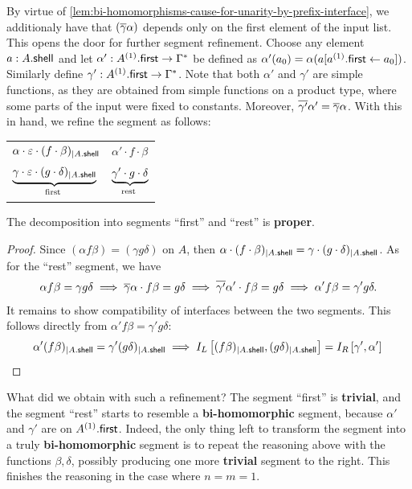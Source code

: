 By virtue of \cref{lem:bi-homomorphisms-cause-for-unarity-by-prefix-interface}, we additionaly have that $(\overline{\gamma} \alpha)$ depends only on the first element of the input list. This opens the door for further segment refinement. Choose any element $a : A . \mathsf{shell}$ and let $\alpha' : A^{(1)} . \mathsf{first} \to \Gamma^*$ be defined as $\alpha'(a_0) = \alpha(a[a^{(1)} . \mathsf{first} \leftarrow a_0])$. Similarly define $\gamma' : A^{(1)} . \mathsf{first} \to \Gamma^*$. Note that both $\alpha'$ and $\gamma'$ are simple functions, as they are obtained from simple functions on a product type, where some parts of the input were fixed to constants. Moreover, $\overline{\gamma'} \alpha' = \overline{\gamma} \alpha$. With this in hand, we refine the segment as follows:

\begin{center}
    \begin{tabular}{l|l}
        $\alpha \cdot \varepsilon \cdot (f \cdot \beta)_{| A . \mathsf{shell}}$ & $\alpha' \cdot f \cdot \beta$ \\
        $\myunderbrace{\gamma \cdot \varepsilon \cdot (g \cdot \delta)_{| \shell{A}}}{\text{first}}$ & $\myunderbrace{\gamma' \cdot g \cdot \delta}{rest}$
    \end{tabular}
\end{center}

\begin{claim}
    The decomposition into segments ``first'' and ``rest'' is \textbf{proper}.
\end{claim}

\begin{proof}
    Since $(\alpha f \beta) = (\gamma g \delta)$ on $A$, then $\alpha \cdot (f \cdot \beta)_{| A . \mathsf{shell}} = \gamma \cdot (g \cdot \delta)_{| A . \mathsf{shell}}$. As for the ``rest'' segment, we have
    \[
        \alpha f \beta = \gamma g \delta \implies \overline{\gamma} \alpha \cdot f \beta = g \delta \implies \overline{\gamma'} \alpha' \cdot f \beta = g \delta \implies \alpha ' f \beta = \gamma' g \delta.
    \]
    It remains to show compatibility of interfaces between the two segments. This follows directly from $\alpha' f \beta = \gamma' g \delta$:
    \[
        \alpha' (f \beta)_{| A . \mathsf{shell}} = \gamma' (g \delta)_{| A . \mathsf{shell}} \implies I_L \left[ (f \beta)_{| A . \mathsf{shell}}, (g \delta)_{| A . \mathsf{shell}} \right] = I_R \left[ \gamma', \alpha' \right] \qedhere
    \]
\end{proof}

What did we obtain with such a refinement? The segment ``first'' is \textbf{trivial}, and the segment ``rest'' starts to resemble a \textbf{bi-homomorphic} segment, because $\alpha'$ and $\gamma'$ are on $A^{(1)} . \mathsf{first}$. Indeed, the only thing left to transform the segment into a truly \textbf{bi-homomorphic} segment is to repeat the reasoning above with the functions $\beta, \delta$, possibly producing one more \textbf{trivial} segment to the right. This finishes the reasoning in the case where $n = m = 1$.


